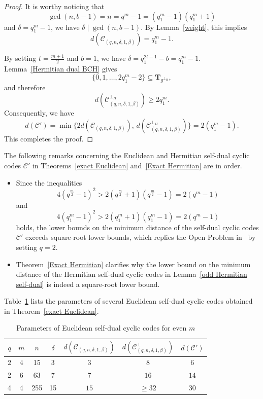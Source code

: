 \documentclass[10pt,a4paper]{amsart}
\begin{document}
\begin{proof}
It is worthy noticing that
\[
\gcd(n, b-1) = n = q^m - 1 = (q_1^m - 1)(q_1^m + 1)
\]
and $\delta = q_1^m - 1$, we have $\delta \mid \gcd(n, b-1)$. By Lemma~\ref{weight}, this implies
\[
d(\mathcal{C}_{(q,n,\delta,1,\beta)}) = q_1^m - 1.
\]

By setting $t = \frac{m+1}{2}$ and $b = 1$, we have $\delta = q_1^{2t-1} - b = q_1^m - 1$. Lemma~\ref{Hermitian dual BCH} gives
\[
\{0,1,\dots,2q_1^m - 2\} \subseteq \mathbf{T}_{g^{\perp_H}},
\]
and therefore
\[
d(\mathcal{C}^{\perp_H}_{(q,n,\delta,1,\beta)}) \ge 2q_1^m.
\]
Consequently, we have
\[
d(\mathcal{C}') = \min\{2d(\mathcal{C}_{(q,n,\delta,1,\beta)}),\, d(\mathcal{C}^{\perp_H}_{(q,n,\delta,1,\beta)})\}
= 2(q_1^m - 1).
\]
This completes the proof.
\end{proof}

The following remarks concerning the Euclidean and Hermitian self-dual cyclic codes $\mathcal{C}'$ in Theorems~\ref{exact Euclidean} and~\ref{Exact Hermitian} are in order.

\begin{itemize}
    \item Since the inequalities 
    \[
    4(q^{\frac{m}{2}} - 1)^2 > 2(q^{\frac{m}{2}} + 1)(q^{\frac{m}{2}} - 1) = 2(q^m - 1)
    \]
    and
    \[
    4(q_1^m - 1)^2 > 2(q_1^m + 1)(q_1^m - 1) = 2(q^m - 1)
    \]
    holds, the lower bounds on the minimum distance of the self-dual cyclic codes $\mathcal{C}'$ exceeds square-root lower bounds, which replies the Open Problem in~\cite{10856234} by setting $q=2$.

    \item Theorem~\ref{Exact Hermitian} clarifies why the lower bound on the minimum distance of the Hermitian self-dual cyclic codes in Lemma~\ref{odd Hermitian self-dual} is indeed a square-root lower bound.
\end{itemize}

Table~\ref{even} lists the parameters of several Euclidean self-dual cyclic codes obtained in Theorem~\ref{exact Euclidean}.

\begin{table}[htbp]
  \centering
  \caption{Parameters of Euclidean self-dual cyclic codes for even $m$}
  \label{even}
  \begin{tabular}{|c|c|c|c|c|c|c|}
    \hline
    $q$ & $m$ & $n$ & $\delta$ & $d(\mathcal{C}_{(q,n,\delta,1,\beta)})$ & $d(\mathcal{C}_{(q,n,\delta,1,\beta)}^\perp)$ & $d(\mathcal{C}')$ \\
    \hline
    2 & 4 & 15 & 3 & $3$ & $8$ & $6$ \\
    \hline
    2 & 6 & 63 & 7 & $7$ & $16$ & $14$ \\
    \hline
    4 & 4 & 255 & 15 & $15$ & $\ge32$ & $30$ \\
    \hline
  \end{tabular}
\end{table}
\end{document}
